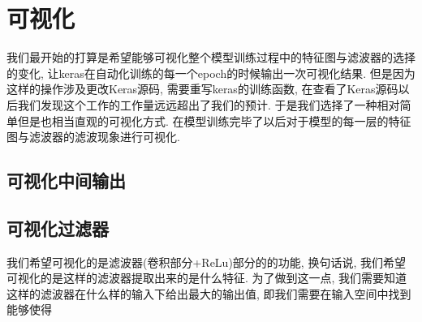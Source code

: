 \documentclass[lang=cn,11pt]{elegantpaper}
\begin{document}
\section{可视化}

我们最开始的打算是希望能够可视化整个模型训练过程中的特征图与滤波器的选择的变化, 让keras在自动化训练的每一个epoch的时候输出一次可视化结果. 但是因为这样的操作涉及更改Keras源码, 需要重写keras的训练函数, 在查看了Keras源码以后我们发现这个工作的工作量远远超出了我们的预计. 于是我们选择了一种相对简单但是也相当直观的可视化方式. 在模型训练完毕了以后对于模型的每一层的特征图与滤波器的滤波现象进行可视化.



\subsection{可视化中间输出}




\subsection{可视化过滤器}

我们希望可视化的是滤波器(卷积部分+ReLu)部分的的功能, 换句话说, 我们希望可视化的是这样的滤波器提取出来的是什么特征. 为了做到这一点, 我们需要知道这样的滤波器在什么样的输入下给出最大的输出值, 即我们需要在输入空间中找到能够使得




\newpage
\nocite{*}



\end{document}
